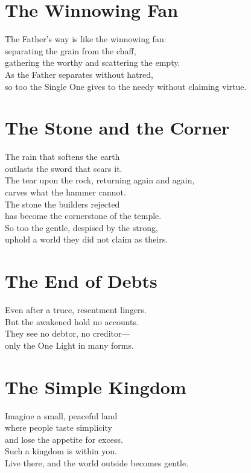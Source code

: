\documentclass[10pt, openright]{book}
\begin{document}
\section{The Winnowing Fan}
The Father's way is like the winnowing fan: \\
separating the grain from the chaff, \\
gathering the worthy and scattering the empty. \\

As the Father separates without hatred, \\
so too the Single One gives to the needy without claiming virtue.

\section{The Stone and the Corner}
The rain that softens the earth \\
outlasts the sword that scars it. \\
The tear upon the rock, returning again and again, \\
carves what the hammer cannot. \\

The stone the builders rejected \\
has become the cornerstone of the temple. \\
So too the gentle, despised by the strong, \\
uphold a world they did not claim as theirs.

\section{The End of Debts}
Even after a truce, resentment lingers. \\
But the awakened hold no accounts. \\
They see no debtor, no creditor— \\
only the One Light in many forms.

\section{The Simple Kingdom}
Imagine a small, peaceful land \\
where people taste simplicity \\
and lose the appetite for excess. \\
Such a kingdom is within you. \\
Live there, and the world outside becomes gentle.
\end{document}
